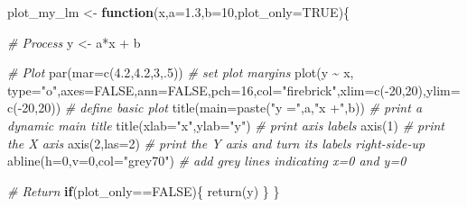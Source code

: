 \documentclass[
]{book}
\newenvironment{Shaded}{\begin{snugshade}}{\end{snugshade}}
\newcommand{\AttributeTok}[1]{\textcolor[rgb]{0.77,0.63,0.00}{#1}}
\newcommand{\CommentTok}[1]{\textcolor[rgb]{0.56,0.35,0.01}{\textit{#1}}}
\newcommand{\ConstantTok}[1]{\textcolor[rgb]{0.00,0.00,0.00}{#1}}
\newcommand{\ControlFlowTok}[1]{\textcolor[rgb]{0.13,0.29,0.53}{\textbf{#1}}}
\newcommand{\DecValTok}[1]{\textcolor[rgb]{0.00,0.00,0.81}{#1}}
\newcommand{\FloatTok}[1]{\textcolor[rgb]{0.00,0.00,0.81}{#1}}
\newcommand{\FunctionTok}[1]{\textcolor[rgb]{0.00,0.00,0.00}{#1}}
\newcommand{\NormalTok}[1]{#1}
\newcommand{\OtherTok}[1]{\textcolor[rgb]{0.56,0.35,0.01}{#1}}
\newcommand{\SpecialCharTok}[1]{\textcolor[rgb]{0.00,0.00,0.00}{#1}}
\newcommand{\StringTok}[1]{\textcolor[rgb]{0.31,0.60,0.02}{#1}}
\begin{document}
\begin{Shaded}
\begin{Highlighting}[]
\NormalTok{plot\_my\_lm }\OtherTok{\textless{}{-}} \ControlFlowTok{function}\NormalTok{(x,}\AttributeTok{a=}\FloatTok{1.3}\NormalTok{,}\AttributeTok{b=}\DecValTok{10}\NormalTok{,}\AttributeTok{plot\_only=}\ConstantTok{TRUE}\NormalTok{)\{}
  
  \CommentTok{\# Process}
\NormalTok{  y }\OtherTok{\textless{}{-}}\NormalTok{ a}\SpecialCharTok{*}\NormalTok{x }\SpecialCharTok{+}\NormalTok{ b}
  
  \CommentTok{\# Plot}
  \FunctionTok{par}\NormalTok{(}\AttributeTok{mar=}\FunctionTok{c}\NormalTok{(}\FloatTok{4.2}\NormalTok{,}\FloatTok{4.2}\NormalTok{,}\DecValTok{3}\NormalTok{,.}\DecValTok{5}\NormalTok{)) }\CommentTok{\# set plot margins}
  \FunctionTok{plot}\NormalTok{(y }\SpecialCharTok{\textasciitilde{}}\NormalTok{ x, }\AttributeTok{type=}\StringTok{"o"}\NormalTok{,}\AttributeTok{axes=}\ConstantTok{FALSE}\NormalTok{,}\AttributeTok{ann=}\ConstantTok{FALSE}\NormalTok{,}\AttributeTok{pch=}\DecValTok{16}\NormalTok{,}\AttributeTok{col=}\StringTok{"firebrick"}\NormalTok{,}\AttributeTok{xlim=}\FunctionTok{c}\NormalTok{(}\SpecialCharTok{{-}}\DecValTok{20}\NormalTok{,}\DecValTok{20}\NormalTok{),}\AttributeTok{ylim=}\FunctionTok{c}\NormalTok{(}\SpecialCharTok{{-}}\DecValTok{20}\NormalTok{,}\DecValTok{20}\NormalTok{)) }\CommentTok{\# define basic plot}
  \FunctionTok{title}\NormalTok{(}\AttributeTok{main=}\FunctionTok{paste}\NormalTok{(}\StringTok{"y ="}\NormalTok{,a,}\StringTok{"x +"}\NormalTok{,b)) }\CommentTok{\# print a dynamic main title}
  \FunctionTok{title}\NormalTok{(}\AttributeTok{xlab=}\StringTok{"x"}\NormalTok{,}\AttributeTok{ylab=}\StringTok{"y"}\NormalTok{)  }\CommentTok{\# print axis labels}
  \FunctionTok{axis}\NormalTok{(}\DecValTok{1}\NormalTok{) }\CommentTok{\# print the X axis}
  \FunctionTok{axis}\NormalTok{(}\DecValTok{2}\NormalTok{,}\AttributeTok{las=}\DecValTok{2}\NormalTok{) }\CommentTok{\# print the Y axis and turn its labels right{-}side{-}up}
  \FunctionTok{abline}\NormalTok{(}\AttributeTok{h=}\DecValTok{0}\NormalTok{,}\AttributeTok{v=}\DecValTok{0}\NormalTok{,}\AttributeTok{col=}\StringTok{"grey70"}\NormalTok{) }\CommentTok{\# add grey lines indicating x=0 and y=0}
  
  \CommentTok{\# Return}
  \ControlFlowTok{if}\NormalTok{(plot\_only}\SpecialCharTok{==}\ConstantTok{FALSE}\NormalTok{)\{}
    \FunctionTok{return}\NormalTok{(y)}
\NormalTok{  \}}
\NormalTok{\}}
\end{Highlighting}
\end{Shaded}
\end{document}
